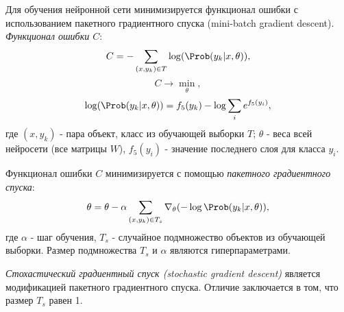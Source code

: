   Для обучения нейронной сети минимизируется функционал ошибки с использованием
  пакетного градиентного спуска (mini-batch gradient descent).
  \textit{Функционал ошибки $C$}:
  \[
    C = - \sum_{(x, y_k) \in T} \log(\Prob(y_k | x, \theta)),
  \]
  \[
    C \rightarrow \min_\theta,
  \]
  \[
    \log(\Prob(y_k | x, \theta)) = f_5(y_k) - \log\sum_i e^{f_5(y_i)},
  \]
  где $(x, y_k)$ - пара объект, класс из обучающей выборки $T$; $\theta$ - веса
  всей нейросети (все матрицы $W$), $f_5(y_i)$ - значение последнего слоя для класса $y_i$.

  Функционал ошибки $C$ минимизируется с помощью \textit{пакетного градиентного спуска}:
  \[
    \theta = \theta - \alpha\sum_{(x, y_k) \in T_s}\nabla_{\theta}(-\log\Prob(y_k | x, \theta)),
  \]
  где $\alpha$ - шаг обучения, $T_s$ - случайное подмножество объектов из обучающей выборки.
  Размер подмножества $T_s$ и $\alpha$ являются гиперпараметрами.

  \textit{Стохастический градиентный спуск (stochastic gradient descent)} является
  модификацией пакетного градиентного спуска. Отличие заключается в том, что размер $T_s$ равен 1.

